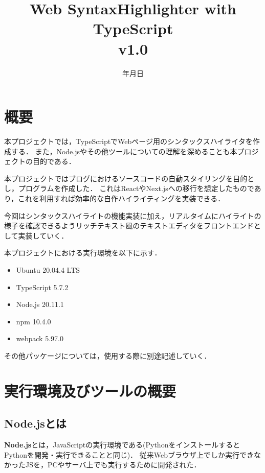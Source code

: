 \documentclass[autodetect-engine,dvi=dvipdfmx,ja=standard,
               a4j,11pt]{bxjsarticle}
\title{Web SyntaxHighlighter with TypeScript \\
       v1.0}
\date{\number\year 年\number\month 月\number\day 日}
\begin{document}
\maketitle

\section{概要}

本プロジェクトでは，TypeScriptでWebページ用のシンタックスハイライタを作成する．
また，Node.jsやその他ツールについての理解を深めることも本プロジェクトの目的である．

本プロジェクトではブログにおけるソースコードの自動スタイリングを目的とし，プログラムを作成した．
これはReactやNext.jsへの移行を想定したものであり，これを利用すれば効率的な自作ハイライティングを実装できる．

今回はシンタックスハイライトの機能実装に加え，リアルタイムにハイライトの様子を確認できるようリッチテキスト風のテキストエディタをフロントエンドとして実装していく．

本プロジェクトにおける実行環境を以下に示す．

\begin{itemize}
  \item Ubuntu 20.04.4 LTS
  \item TypeScript 5.7.2
  \item Node.js 20.11.1
  \item npm 10.4.0
  \item webpack 5.97.0
\end{itemize}
%
その他パッケージについては，使用する際に別途記述していく．

\section{実行環境及びツールの概要}

\subsection{Node.jsとは}

{\bf Node.js}とは，JavaScriptの実行環境である(PythonをインストールするとPythonを開発・実行できることと同じ)．
従来Webブラウザ上でしか実行できなかったJSを，PCやサーバ上でも実行するために開発された．
\end{document}
